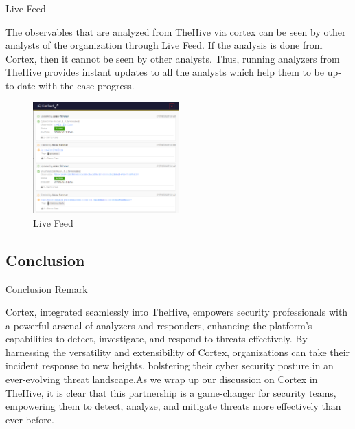 \begin{frame}{Live Feed}
\begin{justify}
    The observables that are analyzed from TheHive via cortex can be seen by other analysts of the organization through Live Feed. If the analysis is done from Cortex, then it cannot be seen by other analysts. Thus, running analyzers from TheHive provides instant updates to all the analysts which help them to be up-to-date with the case progress.
\end{justify}

 \begin{figure}[htp]
    \centering
    \includegraphics[width=0.5\textwidth]{live feed.PNG}
    \caption{Live Feed}
    \label{fig:livefeed}
\end{figure}
    
\end{frame}

\subsection{Conclusion}

\begin{frame}{Conclusion Remark}
\begin{justify}
    Cortex, integrated seamlessly into TheHive, empowers security professionals with a powerful arsenal of analyzers and responders, enhancing the platform's capabilities to detect, investigate, and respond to threats effectively. By harnessing the versatility and extensibility of Cortex, organizations can take their incident response to new heights, bolstering their cyber security posture in an ever-evolving threat landscape.As we wrap up our discussion on Cortex in TheHive, it is clear that this partnership is a game-changer for security teams, empowering them to detect, analyze, and mitigate threats more effectively than ever before.
\end{justify}
    
\end{frame}
